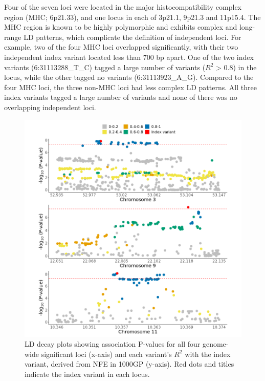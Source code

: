     Four of the seven loci were located in the major histocompatibility complex region (MHC; 6p21.33), and one locus in each of 3p21.1, 9p21.3 and 11p15.4. The MHC region is known to be highly polymorphic and exhibits complex and long-range LD patterns, which complicate the definition of independent loci. 
    For example, two of the four MHC loci overlapped significantly, with their two independent index variant located less than 700 bp apart. One of the two index variants (6:31113288\_T\_C) tagged a large number of variants ($R^{2}$ > 0.8) in the locus, while the other tagged no variants (6:31113923\_A\_G). Compared to the four MHC loci, the three non-MHC loci had less complex LD patterns. All three index variants tagged a large number of variants and none of there was no overlapping independent loci. 


    \begin{figure}[H] 
      \centering    
      \includegraphics[width=1.0\textwidth]{Vector/ukbb_nonmhc_regional_assoc_plots.png}
      \caption[Figure]{LD decay plots showing association P-values for all four genome-wide significant loci (x-axis) and each variant's $R^{2}$ with the index variant, derived from NFE in 1000GP (y-axis). Red dots and titles indicate the index variant in each locus.}
      \label{fig:ukbb_nonmhc_regional_assoc_plots}
      \end{figure}

